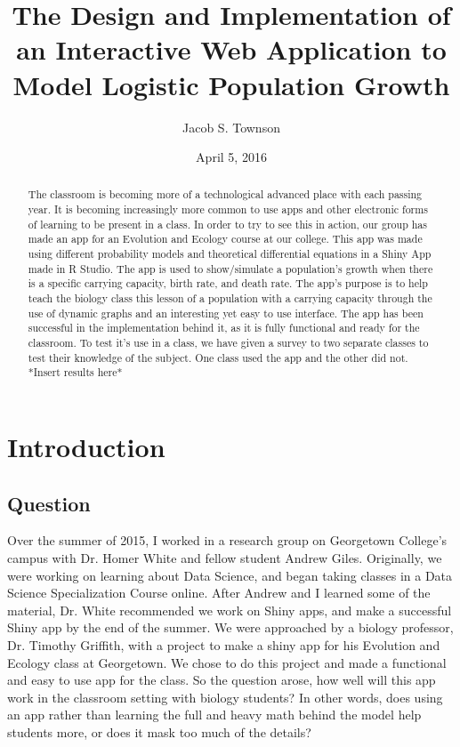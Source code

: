 \documentclass{article}\usepackage[]{graphicx}\usepackage[]{color}
\begin{document}
\title{The Design and Implementation of an Interactive Web Application to Model Logistic Population Growth}
\author{Jacob S. Townson}
\date{April 5, 2016}
\maketitle



\begin{abstract}

The classroom is becoming more of a technological advanced place with each passing year. It is becoming increasingly more common to use apps and other electronic forms of learning to be present in a class. In order to try to see this in action, our group has made an app for an Evolution and Ecology course at our college. This app was made using different probability models and theoretical differential equations in a Shiny App made in R Studio. The app is used to show/simulate a population's growth when there is a specific carrying capacity, birth rate, and death rate. The app's purpose is to help teach the biology class this lesson of a population with a carrying capacity through the use of dynamic graphs and an interesting yet easy to use interface. The app has been successful in the implementation behind it, as it is fully functional and ready for the classroom. To test it's use in a class, we have given a survey to two separate classes to test their knowledge of the subject. One class used the app and the other did not. *Insert results here*

\end{abstract}

\pagebreak

\tableofcontents

\pagebreak

\section{Introduction}

\subsection{Question}

Over the summer of 2015, I worked in a research group on Georgetown College's campus with Dr. Homer White and fellow student Andrew Giles. Originally, we were working on learning about Data Science, and began taking classes in a Data Science Specialization Course online. After Andrew and I learned some of the material, Dr. White recommended we work on Shiny apps, and make a successful Shiny app by the end of the summer. We were approached by a biology professor, Dr. Timothy Griffith, with a project to make a shiny app for his Evolution and Ecology class at Georgetown. We chose to do this project and made a functional and easy to use app for the class. So the question arose, how well will this app work in the classroom setting with biology students? In other words, does using an app rather than learning the full and heavy math behind the model help students more, or does it mask too much of the details?
\end{document}
